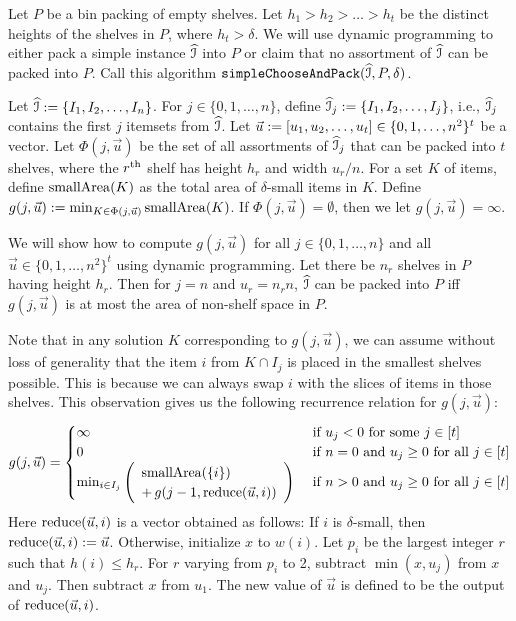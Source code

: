 Let $P$ be a bin packing of empty shelves.
Let $h_1 > h_2 > \ldots > h_t$ be the distinct heights of
the shelves in $P$, where $h_t > \delta$.
We will use dynamic programming to either pack a simple instance $\widehat{\mathcal{I}}$
into $P$ or claim that no assortment of $\widehat{\mathcal{I}}$ can be packed into $P$.
Call this algorithm $\operatorname{\mathtt{simpleChooseAndPack}}(\widehat{\mathcal{I}}, P, \delta)$.

Let $\widehat{\mathcal{I}} := \{I_1, I_2, \ldots, I_n\}$.
For $j \in \{0, 1, \ldots, n\}$, define $\widehat{\mathcal{I}}_j := \{I_1, I_2, \ldots, I_j\}$,
i.e., $\widehat{\mathcal{I}}_j$ contains the first $j$ itemsets from $\widehat{\mathcal{I}}$.
Let $\vec{u} := [u_1, u_2, \ldots, u_t] \in \{0, 1, \ldots, n^2\}^t$ be a vector.
Let $\Phi(j, \vec{u})$ be the set of all assortments of $\widehat{\mathcal{I}}_j$ that can be
packed into $t$ shelves, where the $r^{\textrm{th}}$ shelf has height $h_r$ and width $u_r/n$.
For a set $K$ of items, define $\operatorname{smallArea}(K)$ as
the total area of $\delta$-small items in $K$.
Define $g(j, \vec{u}) := \min_{K \in \Phi(j, \vec{u})} \operatorname{smallArea}(K)$.
If $\Phi(j, \vec{u}) = \emptyset$, then we let $g(j, \vec{u}) = \infty$.

We will show how to compute $g(j, \vec{u})$ for all $j \in \{0, 1, \ldots, n\}$
and all $\vec{u} \in \{0, 1, \ldots, n^2\}^t$ using dynamic programming.
Let there be $n_r$ shelves in $P$ having height $h_r$.
Then for $j = n$ and $u_r = n_r n$, $\widehat{\mathcal{I}}$ can be packed into $P$ iff
$g(j, \vec{u})$ is at most the area of non-shelf space in $P$.

Note that in any solution $K$ corresponding to $g(j, \vec{u})$,
we can assume without loss of generality that the item $i$ from $K \cap I_j$
is placed in the smallest shelves possible.
This is because we can always swap $i$ with the slices of items in those shelves.
This observation gives us the following recurrence relation for $g(j, \vec{u})$:
\begin{equation}
\label{eqn:g-rec}
g(j, \vec{u}) = \begin{cases}
\infty & \textrm{ if } u_j < 0 \textrm{ for some } j \in [t]
\\ 0 & \textrm{ if } n = 0 \textrm{ and } u_j \ge 0 \textrm{ for all } j \in [t]
\\ \min_{i \in I_j} \left(\begin{array}{ll}\operatorname{smallArea}(\{i\})
        \\ + \, g(j-1, \operatorname{reduce}(\vec{u}, i))\end{array} \right)
    & \textrm{ if } n > 0 \textrm{ and } u_j \ge 0 \textrm{ for all } j \in [t]
\end{cases}
\end{equation}
Here $\operatorname{reduce}(\vec{u}, i)$ is a vector obtained as follows:
If $i$ is $\delta$-small, then $\operatorname{reduce}(\vec{u}, i) := \vec{u}$.
Otherwise, initialize $x$ to $w(i)$.
Let $p_i$ be the largest integer $r$ such that $h(i) \le h_r$.
For $r$ varying from $p_i$ to 2, subtract $\min(x, u_j)$ from $x$ and $u_j$.
Then subtract $x$ from $u_1$. The new value of $\vec{u}$ is defined to be
the output of $\operatorname{reduce}(\vec{u}, i)$.

